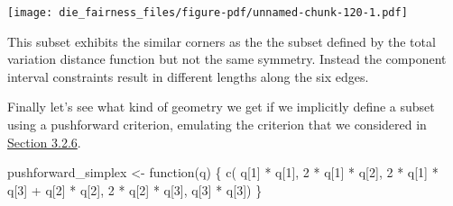 \documentclass[
  letterpaper,
  DIV=11,
  numbers=noendperiod]{scrartcl}
\newenvironment{Shaded}{\begin{snugshade}}{\end{snugshade}}
\newcommand{\ControlFlowTok}[1]{\textcolor[rgb]{0.00,0.23,0.31}{#1}}
\newcommand{\DecValTok}[1]{\textcolor[rgb]{0.68,0.00,0.00}{#1}}
\newcommand{\FunctionTok}[1]{\textcolor[rgb]{0.28,0.35,0.67}{#1}}
\newcommand{\NormalTok}[1]{\textcolor[rgb]{0.00,0.23,0.31}{#1}}
\newcommand{\OtherTok}[1]{\textcolor[rgb]{0.00,0.23,0.31}{#1}}
\newcommand{\SpecialCharTok}[1]{\textcolor[rgb]{0.37,0.37,0.37}{#1}}
\begin{document}
\texttt{[image: die\_fairness\_files/figure-pdf/unnamed-chunk-120-1.pdf]}

This subset exhibits the similar corners as the the subset defined by
the total variation distance function but not the same symmetry. Instead
the component interval constraints result in different lengths along the
six edges.

Finally let's see what kind of geometry we get if we implicitly define a
subset using a pushforward criterion, emulating the criterion that we
considered in \hyperref[sec:effective_pushforward]{Section 3.2.6}.

\begin{Shaded}
\begin{Highlighting}[]
\NormalTok{pushforward\_simplex }\OtherTok{\textless{}{-}} \ControlFlowTok{function}\NormalTok{(q) \{}
  \FunctionTok{c}\NormalTok{(    q[}\DecValTok{1}\NormalTok{] }\SpecialCharTok{*}\NormalTok{ q[}\DecValTok{1}\NormalTok{],}
    \DecValTok{2} \SpecialCharTok{*}\NormalTok{ q[}\DecValTok{1}\NormalTok{] }\SpecialCharTok{*}\NormalTok{ q[}\DecValTok{2}\NormalTok{],}
    \DecValTok{2} \SpecialCharTok{*}\NormalTok{ q[}\DecValTok{1}\NormalTok{] }\SpecialCharTok{*}\NormalTok{ q[}\DecValTok{3}\NormalTok{] }\SpecialCharTok{+}\NormalTok{ q[}\DecValTok{2}\NormalTok{] }\SpecialCharTok{*}\NormalTok{ q[}\DecValTok{2}\NormalTok{],}
    \DecValTok{2} \SpecialCharTok{*}\NormalTok{ q[}\DecValTok{2}\NormalTok{] }\SpecialCharTok{*}\NormalTok{ q[}\DecValTok{3}\NormalTok{],}
\NormalTok{        q[}\DecValTok{3}\NormalTok{] }\SpecialCharTok{*}\NormalTok{ q[}\DecValTok{3}\NormalTok{])}
\NormalTok{\}}
\end{Highlighting}
\end{Shaded}
\end{document}
